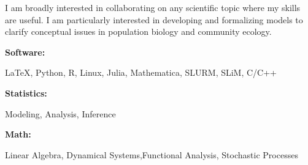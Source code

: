 \documentclass[9pt]{developercv} %
\begin{document}
\begin{minipage}[t]{0.46\textwidth}
	\vspace{-6pt}

	I am broadly interested in collaborating on any scientific topic where my skills are useful. I am particularly interested in developing and formalizing models to clarify conceptual issues in population biology and community ecology. \\

\end{minipage}
\hfill %
\begin{minipage}[t]{0.465\textwidth}
    \vspace{-6pt}
    
    \begin{minipage}[t]{0.2\textwidth}
        \textbf{Software:}
    \end{minipage}
    \hfill
    \begin{minipage}[t]{0.75\textwidth}
      \LaTeX, Python, R, Linux, Julia, Mathematica, SLURM, SLiM, C/C++
    \end{minipage}
    \vspace{4mm}

    \vspace{-5 pt}
    \begin{minipage}[t]{0.2\textwidth}
        \textbf{Statistics:}
    \end{minipage}
    \hfill
    \begin{minipage}[t]{0.75\textwidth}
      Modeling, Analysis, Inference
    \end{minipage}
    \vspace{4mm}

    \vspace{-5 pt}
    \begin{minipage}[t]{0.2\textwidth}
        \textbf{Math:}
    \end{minipage}
    \hfill
    \begin{minipage}[t]{0.75\textwidth}
      Linear Algebra, Dynamical Systems,\newline Functional Analysis, Stochastic Processes
    \end{minipage}

\end{minipage}

\end{document}
